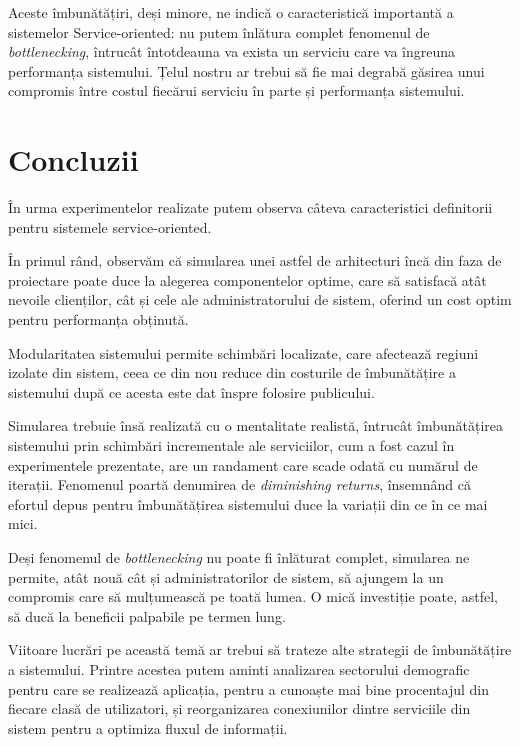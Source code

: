 \documentclass[12pt]{article}
\begin{document}
            Aceste îmbunătățiri, deși minore, ne indică o caracteristică importantă a sistemelor Service-oriented: nu putem înlătura complet fenomenul de \textit{bottlenecking}, întrucât întotdeauna va exista un serviciu care va îngreuna performanța sistemului. Țelul nostru ar trebui să fie mai degrabă găsirea unui compromis între costul fiecărui serviciu în parte și performanța sistemului.
            \pagebreak

    \section{Concluzii}
        În urma experimentelor realizate putem observa câteva caracteristici definitorii pentru sistemele service-oriented.

        În primul rând, observăm că simularea unei astfel de arhitecturi încă din faza de proiectare poate duce la alegerea componentelor optime, care să satisfacă atât nevoile clienților, cât și cele ale administratorului de sistem, oferind un cost optim pentru performanța obținută.

        Modularitatea sistemului permite schimbări localizate, care afectează regiuni izolate din sistem, ceea ce din nou reduce din costurile de îmbunătățire a sistemului după ce acesta este dat înspre folosire publicului.

        Simularea trebuie însă realizată cu o mentalitate realistă, întrucât îmbunătățirea sistemului prin schimbări incrementale ale serviciilor, cum a fost cazul în experimentele prezentate, are un randament care scade odată cu numărul de iterații. Fenomenul poartă denumirea de \textit{diminishing returns}, însemnând că efortul depus pentru îmbunătățirea sistemului duce la variații din ce în ce mai mici.

        Deși fenomenul de \textit{bottlenecking} nu poate fi înlăturat complet, simularea ne permite, atât nouă cât și administratorilor de sistem, să ajungem la un compromis care să mulțumească pe toată lumea. O mică investiție poate, astfel, să ducă la beneficii palpabile pe termen lung.

        Viitoare lucrări pe această temă ar trebui să trateze alte strategii de îmbunătățire a sistemului. Printre acestea putem aminti analizarea sectorului demografic pentru care se realizează aplicația, pentru a cunoaște mai bine procentajul din fiecare clasă de utilizatori, și reorganizarea conexiunilor dintre serviciile din sistem pentru a optimiza fluxul de informații.
\end{document}
